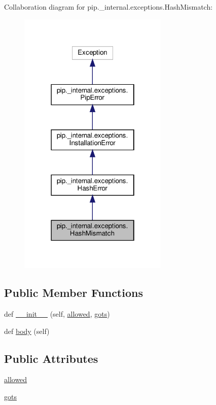 Collaboration diagram for pip.\+\_\+internal.\+exceptions.\+Hash\+Mismatch\+:
\nopagebreak
\begin{figure}[H]
\begin{center}
\leavevmode
\includegraphics[width=202pt]{classpip_1_1__internal_1_1exceptions_1_1HashMismatch__coll__graph}
\end{center}
\end{figure}
\subsection*{Public Member Functions}
\begin{DoxyCompactItemize}
\item 
def \hyperlink{classpip_1_1__internal_1_1exceptions_1_1HashMismatch_aab8a4ca77ea02ae1c55ff6b8405ccfa2}{\+\_\+\+\_\+init\+\_\+\+\_\+} (self, \hyperlink{classpip_1_1__internal_1_1exceptions_1_1HashMismatch_a75f1e4930d8d7dca662cfa12bd05842f}{allowed}, \hyperlink{classpip_1_1__internal_1_1exceptions_1_1HashMismatch_abae5463ebcc1108c4695cad4065133ce}{gots})
\item 
def \hyperlink{classpip_1_1__internal_1_1exceptions_1_1HashMismatch_a291b79ce98fe4b95dd32dfdb2bde1fd3}{body} (self)
\end{DoxyCompactItemize}
\subsection*{Public Attributes}
\begin{DoxyCompactItemize}
\item 
\hyperlink{classpip_1_1__internal_1_1exceptions_1_1HashMismatch_a75f1e4930d8d7dca662cfa12bd05842f}{allowed}
\item 
\hyperlink{classpip_1_1__internal_1_1exceptions_1_1HashMismatch_abae5463ebcc1108c4695cad4065133ce}{gots}
\end{DoxyCompactItemize}
